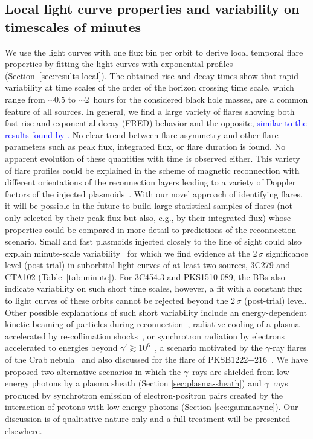 \documentclass[twocolumn,linenumbers]{aastex62}
\newcommand{\Grays}{$\gamma$~rays\xspace}
\newcommand{\gray}{$\gamma$-ray\xspace}
\newcommand{\response}[1]{\textcolor{blue}{#1}}
\begin{document}
\subsection{Local light curve properties and variability on timescales of minutes}
We use the light curves with one flux bin per orbit to derive local temporal flare properties by fitting the light curves with exponential  profiles (Section~\ref{sec:results-local}).
The obtained rise and decay times show that rapid variability at time scales of the order of the horizon crossing time scale, which range from $\sim 0.5$ to $\sim 2$ \,hours for the considered black hole masses, are a common feature of all sources.
In general, we find a large variety of flares showing both fast-rise and exponential decay (FRED) behavior and the opposite, \response{
similar to the results found by \citet[][see their Fig. 10]{2019MNRAS.482..743R}.
}
No clear trend between flare asymmetry and other flare parameters such as peak flux, integrated flux, or flare duration is found. 
No apparent evolution of these quantities with time is observed either. 
This variety of flare profiles could be explained in the scheme of magnetic reconnection with different orientations of the reconnection layers leading to a variety of Doppler factors of the injected plasmoids~\citep[e.g.,][]{2016MNRAS.462.3325P,2018MNRAS.tmp.2522C}. 
With our novel approach of identifying flares, it will be possible in the future to build large statistical samples of flares (not only selected by their peak flux but also, e.g., by their integrated flux) whose properties could be compared in more detail to predictions of the reconnection scenario.
Small and fast plasmoids injected closely to the line of sight could also explain minute-scale variability~\citep{2016MNRAS.462.3325P} for which we find evidence at the 2\,$\sigma$ significance level (post-trial) in suborbital light curves of at least two sources, 3C279 and CTA102 (Table~\ref{tab:minute}). 
For 3C454.3 and PKS1510-089, the BBs also indicate variability on such short time scales, however, a fit with a constant flux to light curves of these orbits cannot be rejected beyond the $2\,\sigma$ (post-trial) level.
Other possible explanations of such short variability include an energy-dependent kinetic beaming of particles during reconnection~\citep{2012ApJ...754L..33C}, radiative cooling of a plasma accelerated by re-collimation shocks~\citep{Bodo:2017qqn}, or synchrotron radiation by electrons accelerated to energies beyond $\gamma' \gtrsim 10^6$~\citep{TheFermi-LAT:2016dss}, a scenario motivated by the \gray flares of the Crab nebula~\citep{2011Sci...331..739A} and also discussed for the flare of PKSB1222+216~\citep{2012MNRAS.425.2519N}.
We have proposed two alternative scenarios in which the \Grays are shielded from low energy photons by a plasma sheath (Section \ref{sec:plasma-sheath}) and \Grays produced by synchrotron emission of electron-positron pairs created by the interaction of protons with low energy photons (Section \ref{sec:gammasync}). Our discussion is of qualitative nature only and a full treatment will be presented elsewhere. 
\end{document}
